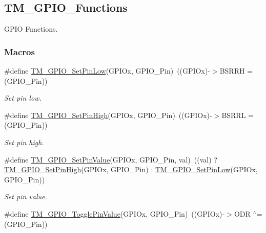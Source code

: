 \hypertarget{group___t_m___g_p_i_o___functions}{}\subsection{T\+M\+\_\+\+G\+P\+I\+O\+\_\+\+Functions}
\label{group___t_m___g_p_i_o___functions}


G\+P\+I\+O Functions.  


\subsubsection*{Macros}
\begin{DoxyCompactItemize}
\item 
\#define \hyperlink{group___t_m___g_p_i_o___functions_gaccceda87ce348c73b43780fdfed048d3}{T\+M\+\_\+\+G\+P\+I\+O\+\_\+\+Set\+Pin\+Low}(G\+P\+I\+Ox,  G\+P\+I\+O\+\_\+\+Pin)~((G\+P\+I\+Ox)-\/$>$B\+S\+R\+R\+H = (G\+P\+I\+O\+\_\+\+Pin))
\begin{DoxyCompactList}\small\item\em Set pin low. \end{DoxyCompactList}\item 
\#define \hyperlink{group___t_m___g_p_i_o___functions_gac5aa8fbc39ed67f47972097fb7c8d69d}{T\+M\+\_\+\+G\+P\+I\+O\+\_\+\+Set\+Pin\+High}(G\+P\+I\+Ox,  G\+P\+I\+O\+\_\+\+Pin)~((G\+P\+I\+Ox)-\/$>$B\+S\+R\+R\+L = (G\+P\+I\+O\+\_\+\+Pin))
\begin{DoxyCompactList}\small\item\em Set pin high. \end{DoxyCompactList}\item 
\#define \hyperlink{group___t_m___g_p_i_o___functions_gaf0bc34b72794ca43246ef88cfd261e80}{T\+M\+\_\+\+G\+P\+I\+O\+\_\+\+Set\+Pin\+Value}(G\+P\+I\+Ox,  G\+P\+I\+O\+\_\+\+Pin,  val)~((val) ? \hyperlink{group___t_m___g_p_i_o___functions_gac5aa8fbc39ed67f47972097fb7c8d69d}{T\+M\+\_\+\+G\+P\+I\+O\+\_\+\+Set\+Pin\+High}(G\+P\+I\+Ox, G\+P\+I\+O\+\_\+\+Pin) \+: \hyperlink{group___t_m___g_p_i_o___functions_gaccceda87ce348c73b43780fdfed048d3}{T\+M\+\_\+\+G\+P\+I\+O\+\_\+\+Set\+Pin\+Low}(G\+P\+I\+Ox, G\+P\+I\+O\+\_\+\+Pin))
\begin{DoxyCompactList}\small\item\em Set pin value. \end{DoxyCompactList}\item 
\#define \hyperlink{group___t_m___g_p_i_o___functions_ga92ef176c8195c54b326b3c7526b878b2}{T\+M\+\_\+\+G\+P\+I\+O\+\_\+\+Toggle\+Pin\+Value}(G\+P\+I\+Ox,  G\+P\+I\+O\+\_\+\+Pin)~((G\+P\+I\+Ox)-\/$>$O\+D\+R $^\wedge$= (G\+P\+I\+O\+\_\+\+Pin))

\end{DoxyCompactItemize}
